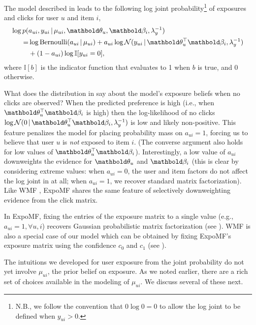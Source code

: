 The model described in 
leads to the following log joint probability\footnote{N.B., we follow the convention that $0 \log 0 = 0$ to allow the log joint to be defined when $y_{ui}>0$.} of exposures and clicks 
for user $u$ and item $i$,
\begin{equation}
\begin{split}
	\log p( & a_{ui}, y_{ui} \g \mu_{ui}, \mb\theta_u, \mb\beta_i, \lambda_y^{-1}) \\ 
	= & \log \mathrm{Bernoulli}(a_{ui} \g \mu_{ui}) + 
	a_{ui} \log \mathcal{N}(y_{ui} \g \mb\theta_u^\top \mb\beta_i, \lambda_y^{-1}) \\
	& + (1-a_{ui}) \log \mathbb{I}[y_{ui}=0], %
	\end{split}
	\label{eq:a_y_joint}
\end{equation}
where $\mathbb{I}[b]$ is the indicator function that evaluates to 1 when $b$ is true, and 0 otherwise. 

What does the distribution in  say 
about the model's exposure beliefs when no clicks are observed? 
When the predicted preference is high 
(i.e., when $\mb\theta_u^\top \mb\beta_i$ is high) 
then the log-likelihood of no clicks $\log \mathcal{N}(0 \g \mb\theta_u^\top \mb\beta_i, \lambda^{-1}_y)$ is low and likely non-positive.
This feature penalizes the model 
for placing probability mass on $a_{ui}=1$, 
forcing us to believe that user $u$ is \emph{not} exposed to item $i$. 
(The converse argument also holds for low values of $\mb\theta_u^\top \mb\beta_i$). 
Interestingly, a low value of $a_{ui}$ 
downweights the evidence for $\mb\theta_u$ and $\mb\beta_i$ 
(this is clear by considering extreme values: 
when $a_{ui}=0$, the user and item factors do not affect the log joint in  at all; 
when $a_{ui}=1$, we recover standard matrix factorization). 
Like \gls{WMF} \citep{hu2008collaborative}, ExpoMF shares the same feature of selectively downweighting evidence from the click matrix. 

In ExpoMF, fixing the entries of the exposure matrix to a single value
(e.g., $a_{ui}=1, \forall u, i$) recovers Gaussian probabilistic matrix
factorization \cite{salakhutdinov2008probabilistic} (see ). \gls{WMF} is also a special case of
our model which can be obtained by fixing ExpoMF's exposure matrix using the confidence $c_0$ and $c_1$ (see ).

The intuitions we developed for 
user exposure from the joint probability 
do not yet involve $\mu_{ui}$, 
the prior belief on exposure. 
As we noted earlier, 
there are a rich set of choices 
available in the modeling of $\mu_{ui}$. 
We discuss several of these next.

